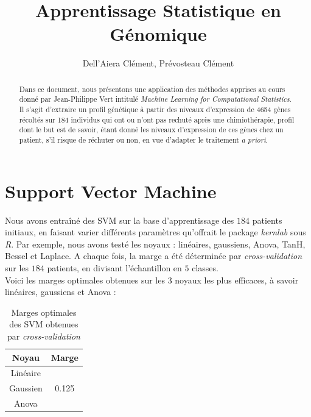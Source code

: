 \documentclass{article}
\title{Apprentissage Statistique en Génomique}
\author{Dell'Aiera Clément, Prévosteau Clément}
\date{}
\begin{document}
\maketitle

\begin{abstract}
Dans ce document, nous présentons une application des méthodes apprises au cours donné par Jean-Philippe Vert intitulé \textit{Machine Learning for Computational Statistics}. Il s'agit d'extraire un profil génétique à partir des niveaux d'expression de 4654 gènes récoltés sur 184 individus qui ont ou n'ont pas rechuté après une chimiothérapie, profil dont le but est de savoir, étant donné les niveaux d'expression de ces gènes chez un patient, s'il risque de réchuter ou non, en vue d'adapter le traitement \textit{a priori}. 
\end{abstract}

\newpage

\tableofcontents

\newpage

\section{Support Vector Machine}

Nous avons entraîné des SVM sur la base d'apprentissage des $184$ patients initiaux, en faisant varier différents paramètres qu'offrait le package \textit{kernlab} sous \textit{R}. Par exemple, nous avons testé les noyaux : linéaires, gaussiens, Anova, TanH, Bessel et Laplace. A chaque fois, la marge a été déterminée par \textit{cross-validation} sur les $184$ patients, en divisant l'échantillon en $5$ classes.\\

Voici les marges optimales obtenues sur les 3 noyaux les plus efficaces, à savoir linéaires, gaussiens et Anova :
\begin{table}[!ht]
\center
\begin{tabular}{|c|c|}
\hline
\textbf{Noyau} & \textbf{Marge}\\
\hline
Linéaire & \\
\hline
Gaussien & 0.125 \\
\hline
Anova & \\
\hline
\end{tabular}
\caption{Marges optimales des SVM obtenues par \textit{cross-validation}}
\label{Margin}
\end{table}
\end{document}
